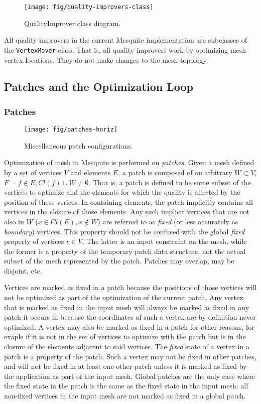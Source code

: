 \documentclass{article}
\begin{document}
\begin{figure}[htb]
\texttt{[image: fig/quality-improvers-class]}
\caption{QualityImprover class diagram.\label{fig:qual-improv-class}}
\end{figure}

All quality improvers in the current Mesquite implementation are subclasses of the \texttt{VertexMover} class.  That is, all quality improvers work by optimizing mesh vertex locations.  They do not make changes to the mesh topology.

\subsection{Patches and the Optimization Loop}

\subsubsection{Patches}

\begin{figure}[htb]
\texttt{[image: fig/patches-horiz]}
\caption{Miscellaneous patch configurations.\label{fig:patch-types}}
\end{figure}

Optimization of mesh in Mesquite is performed on \emph{patches}.  Given a mesh defined by a set of vertices $V$ and elements $E$, a patch is composed of an arbitrary $W \subset V$,  $F={f \in E, Cl(f) \cup W \ne \emptyset}$.  That is, a patch is defined to be some subset of the vertices to optimize and the elements for which the quality is affected by the position of these verices.  In containing elements, the patch implicitly contains all vertices in the closure of those elements.  Any such implicit vertices that are not also in $W$ ($x \in Cl(E), x \notin W$) are referred to as \emph{fixed} (or less accurately as \emph{boundary}) vertices.  This property should not be confused with the global \emph{fixed} property of vertices $v \in V$.  The latter is an input constraint on the mesh, while the former is a property of the temporary patch data structure, not the actual subset of the mesh represented by the patch.   Patches may overlap, may be disjoint, etc.

Vertices are marked as fixed in a patch because the positions of those vertices will not be optimized as part of the optimization of the current patch.  Any vertex that is marked as fixed in the input mesh will always be marked as fixed in any patch it occurs in because the coordinates of such a vertex are by definition never optimized.  A vertex may also be marked as fixed in a patch for other reasons, for exaple if it is not in the set of vertices to optimize with the patch but is in the closure of the elements adjacent to said vertices.  The \emph{fixed} state of a vertex in a patch is a property of the patch.  Such a vertex may not be fixed in other patches, and will not be fixed in at least one other patch unless it is marked as fixed by the application as part of the input mesh.  Global patches are the only case where the fixed state in the patch is the same as the fixed state in the input mesh:  all non-fixed vertices in the input mesh are not marked as fixed in a global patch.
\end{document}
